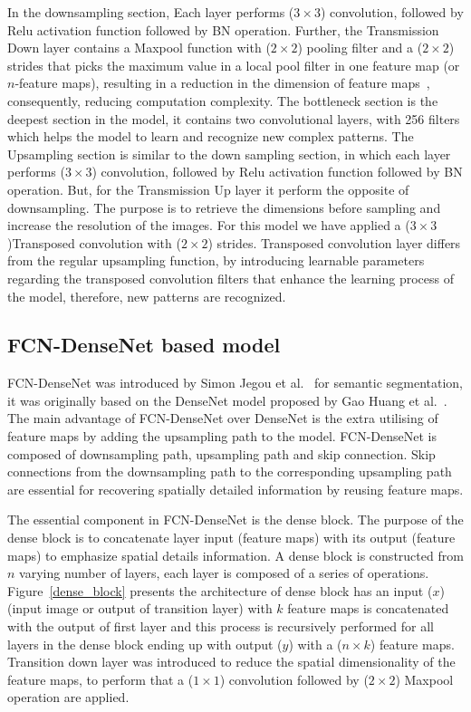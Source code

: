 \documentclass[preprint,10pt]{elsarticle}
\begin{document}
In the downsampling section,
Each layer performs (\(3\times3\)) convolution, followed by Relu activation function followed by BN operation.
Further, the Transmission Down layer contains a Maxpool function with (\(2\times2\)) pooling filter and a (\(2\times2\)) strides that picks the maximum value in a local pool filter in one feature map (or \(n\)-feature maps), resulting in a reduction in the dimension of feature maps~\cite{Lecun2015}, consequently, reducing computation complexity.
The bottleneck section is the deepest section in the model, it contains two convolutional layers, with 256 filters which helps the model to learn and recognize new complex patterns.
The Upsampling section is similar to the down sampling section, in which each layer  performs (\(3\times3\)) convolution, followed by Relu activation function followed by BN operation. But, for the Transmission Up layer it perform the opposite of downsampling.
The purpose is to retrieve the dimensions before sampling and increase the resolution of the images. 
For this model we have applied a (\(3\times3\))Transposed convolution with (\(2\times2\)) strides.
Transposed convolution layer differs from the regular upsampling function, by introducing learnable parameters regarding the transposed convolution filters that enhance the learning process of the model, therefore, new patterns are recognized. 


\subsection{FCN-DenseNet based model}
FCN-DenseNet was introduced by Simon Jegou et al.~\cite{Jegou} for semantic segmentation, it was originally based on the DenseNet model proposed by Gao Huang et al.~\cite{Huang}. 
The main advantage of FCN-DenseNet over DenseNet is the extra utilising of feature maps by adding the upsampling path to the model.
FCN-DenseNet is composed of downsampling path, upsampling path and skip connection.
Skip connections from the downsampling path to the corresponding upsampling path are essential for recovering spatially detailed information by reusing feature maps.
 
The essential component in FCN-DenseNet is the dense block.
The purpose of the dense block is to concatenate layer input (feature maps) with its output (feature maps) to emphasize spatial details information.
A dense block is constructed from \(n\) varying number of layers, each layer is composed of a series of operations.
Figure~\ref{dense_block} presents the architecture of dense block has an input (\(x\)) (input image or output of transition layer) with \(k\) feature maps is concatenated with the output of first layer and this process is recursively performed for all layers in the dense block ending up with output (\(y\)) with a (\(n\times k\)) feature maps. 
Transition down layer was introduced to reduce the spatial dimensionality of the feature maps, to perform that a (\(1\times 1\))  convolution followed by (\(2\times2\)) Maxpool operation are applied. 
\end{document}
